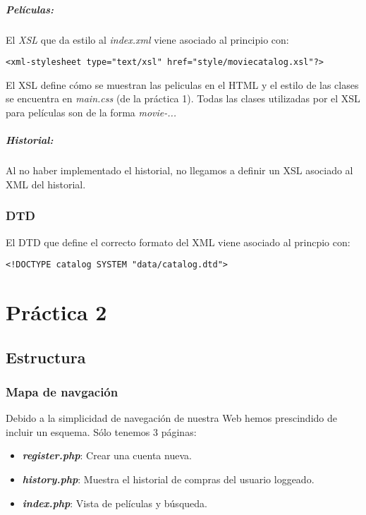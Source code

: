 \documentclass{apuntes}
\begin{document}
\paragraph{Películas: }
El \textit{XSL} que da estilo al \textit{index.xml} viene asociado al principio con:
\begin{verbatim}
<xml-stylesheet type="text/xsl" href="style/moviecatalog.xsl"?>
\end{verbatim}

El XSL define cómo se muestran las peliculas en el HTML y el estilo de las clases se encuentra en \textit{main.css} (de la práctica 1). Todas las clases utilizadas por el XSL para películas son de la forma \textit{movie-...}


\paragraph{Historial: }
Al no haber implementado el historial, no llegamos a definir un XSL asociado al XML del historial.

\subsection{DTD}

El DTD que define el correcto formato del XML viene asociado al princpio con:

\begin{verbatim}
<!DOCTYPE catalog SYSTEM "data/catalog.dtd">
\end{verbatim}


\chapter{Práctica 2}


\section{Estructura}

\subsection{Mapa de navgación}

Debido a la simplicidad de navegación de nuestra Web hemos prescindido de incluir un esquema. Sólo tenemos 3 páginas: \begin{itemize}
\item \textbf{\textit{register.php}}: Crear una cuenta nueva.
\item \textbf{\textit{history.php}}: Muestra el historial de compras del usuario loggeado.
\item \textbf{\textit{index.php}}: Vista de películas y búsqueda.
\end{itemize}
\end{document}
